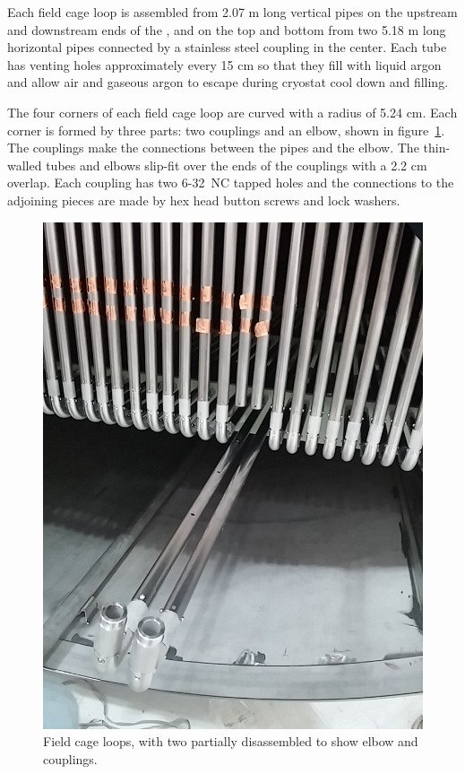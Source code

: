 Each field cage loop is assembled from 2.07 m long vertical pipes on the upstream and downstream ends of the \lartpc, and on the top and bottom from two 5.18 m long horizontal pipes connected by a stainless steel coupling in the center.  Each tube has venting holes approximately every 15 cm so that they fill with liquid argon and allow air and gaseous argon to escape during cryostat cool down and filling.

The four corners of each field cage loop are curved with a radius of 5.24 cm. Each corner is formed by three parts: two couplings and an elbow, shown in figure~\ref{fig:tpc-fieldcage-elbows}. The couplings make the connections between the pipes and the elbow. The thin-walled tubes and elbows slip-fit over the ends of the couplings with a 2.2 cm overlap. Each coupling has two 6-32~NC tapped holes and the connections to the adjoining pieces are made by hex head button screws and lock washers.

\begin{figure}[htb]
\centering	
\includegraphics[width=0.8\linewidth]{figures/tpc-fieldcage-elbows.jpg}
\caption{Field cage loops, with two partially disassembled to show elbow and couplings.}
\label{fig:tpc-fieldcage-elbows}
\end{figure}

